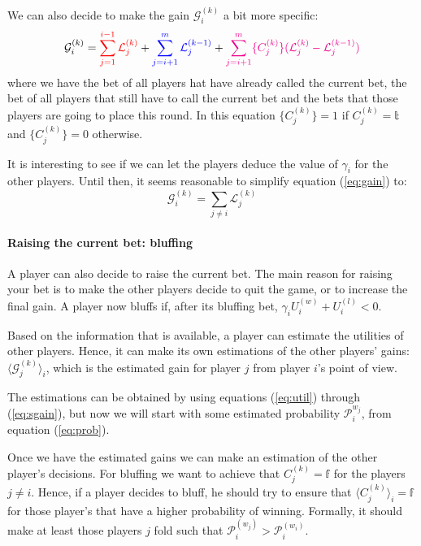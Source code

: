 \documentclass[a4paper,10pt]{article}
\begin{document}
We can also decide to make the gain $\mathcal G^{(k)}_i$ a bit more specific:
\begin{equation}
\mathcal G^{(k)}_i = {\color{red} \sum_{j=1}^{i-1} \mathcal L^{(k)}_j} + {\color{blue} \sum_{j=i+1}^m \mathcal L^{(k-1)}_j} + {\color{magenta} \sum_{j=i+1}^m \{ C^{(k)}_j\} (\mathcal L^{(k)}_j - \mathcal L^{(k-1)}_j)}
\label{eq:gain}
\end{equation}
where we have the {\color{red} bet of all players hat have already called the current bet}, the {\color{blue} bet of all players that still have to call the current bet} and {\color{magenta} the bets that those players are going to place this round}. In this equation $\{C^{(k)}_j\} = 1$ if $C^{(k)}_j=\mathbb{t}$ and $\{C^{(k)}_j\} = 0$ otherwise.

It is interesting to see if we can let the players deduce the value of $\gamma_i$ for the other players. Until then, it seems reasonable to simplify equation (\ref{eq:gain}) to:
\begin{equation}
\mathcal{G}^{(k)}_i = \sum_{j\neq i} \mathcal L^{(k)}_j
\label{eq:sgain}
\end{equation}

\paragraph{Raising the current bet: bluffing}
A player can also decide to raise the current bet. The main reason for raising your bet is to make the other players decide to quit the game, or to increase the final gain. A player now bluffs if, after its bluffing bet, $\gamma_i U^{(w)}_i + U^{(l)}_i < 0$. 

Based on the information that is available, a player can estimate the utilities of other players. Hence, it can make its own estimations of the other players' gains: $\langle \mathcal G^{(k)}_j \rangle_i$, which is the estimated gain for player $j$ from player $i$'s point of view. 

The estimations can be obtained by using equations (\ref{eq:util}) through (\ref{eq:sgain}), but now we will start with some estimated probability $\mathcal P^{w_j}_i$, from equation (\ref{eq:prob}).

Once we have the estimated gains we can make an estimation of the other player's decisions. For bluffing we want to achieve that $C^{(k)}_j = \mathbb{f}$ for the players $j\neq i$. Hence, if a player decides to bluff, he should try to ensure that $\langle C^{(k)}_j \rangle_i = \mathbb{f}$ for those player's that have a higher probability of winning. Formally, it should make at least those players $j$ fold such that $\mathcal P^{(w_j)}_i > \mathcal P^{(w_i)}_i$. 
\end{document}
